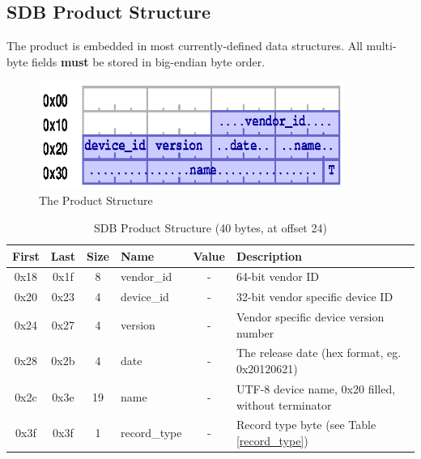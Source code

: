 \documentclass[a4paper, 12pt]{article}
\begin{document}
\pagebreak 

\subsection{SDB Product Structure}

The product is embedded in most currently-defined data structures.
All multi-byte fields \textbf{must} be stored in big-endian byte order.

\begin{figure}[h]
\centering%
\includegraphics[width=100mm]{img/sdb-product.ps}
\caption{The Product Structure}
\label{fig:FigureProduct}
\end{figure}

\begin{center}
  \begin{savenotes}
    \begin{table}[!ht]\footnotesize
      \caption{SDB Product Structure (40 bytes, at offset 24)}\label{sdb_product}\centering
        \begin{tabular}{| c | c | c | l | c | p{5cm} |} \hline
        First & Last & Size & Name & Value & Description \\ \hline
        0x18 & 0x1f & 8 & vendor\_id & - & 64-bit vendor ID \\ \hline
        0x20 & 0x23 & 4 & device\_id & - & 32-bit vendor specific device ID \\ \hline
        0x24 & 0x27 & 4 & version & - & Vendor specific device version number \\ \hline
        0x28 & 0x2b & 4 & date & - & The release date (hex format, eg. 0x20120621) \\ \hline
        0x2c & 0x3e & 19 & name & - & UTF-8 device name, 0x20 filled, without terminator \\ \hline
        0x3f & 0x3f & 1 & record\_type & - & Record type byte (see Table \ref{record_type}) \\ \hline
        \end{tabular}
    \end{table}
  \end{savenotes}
\end{center}
\end{document}
